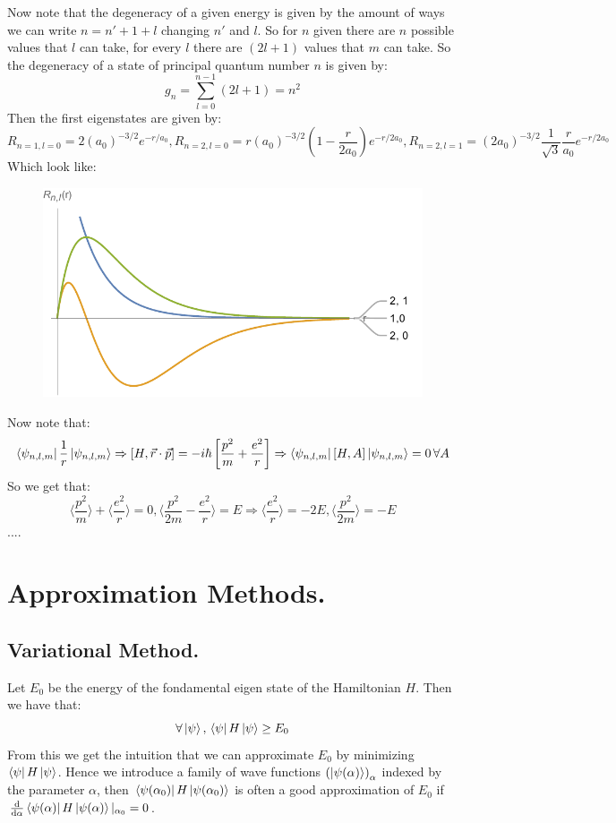 \documentclass[10pt,a4paper]{book}
\begin{document}
Now note that the degeneracy of a given energy is given by the amount of ways we can write $n = n' + 1 + l$ changing $n'$ and $l$. So for $n$ given there are $n$ possible values that $l$ can take, for every $l$ there are $(2l +1)$ values that $m$ can take. So the degeneracy of a state of principal quantum number $n$ is given by:
\[
g_n = \sum_{l = 0}^{n-1} (2l + 1) = n^2
\]
Then the first eigenstates are given by:
\[
R_{n = 1, l =0} = 2(a_0)^{-3/2} e^{-r/a_0}, R_{n = 2, l = 0} = r (a_0)^{-3/2} (1 - \frac{r}{2 a_0})e^{-r/2a_0}, R_{n = 2, l = 1} = (2 a_0)^{-3/2} \frac{1}{\sqrt{3}} \frac{r}{a_0}e^{-r/2a_0}
\]
Which look like:
\begin{figure}[h!]
\centering
\includegraphics[width = 0.6 \textwidth]{graphs/hydrogen_atom_R_Plots}
\end{figure}

Now note that:
\[
\bra{\psi_{n,l,m}} \frac{1}{r} \ket{\psi_{n,l,m}} \Rightarrow [H, \vec{r} \cdot \vec{p}] = - i\hbar \left[\frac{p^2}{m} + \frac{e^2}{r}\right] \Rightarrow \bra{\psi_{n, l, m}} [H, A] \ket{\psi_{n,l,m}} = 0\, \forall A 
\]
So we get that:
\[
\langle \frac{p^2}{m} \rangle + \langle \frac{e^2}{r} \rangle = 0, \langle \frac{p^2}{2m} - \frac{e^2}{r} \rangle = E \Rightarrow \langle \frac{e^2}{r} \rangle = -2 E, \langle \frac{p^2}{2m} \rangle = - E
\]
....

\chapter{Approximation Methods.}
\section{Variational Method.}
Let $E_0$ be the energy of the fondamental eigen state of the Hamiltonian $H$. Then we have that:
\[
\forall \ket\psi, \, \bra \psi H \ket \psi \geq E_0
\]
From this we get the intuition that we can approximate $E_0$ by minimizing $\bra \psi H \ket \psi$. Hence we introduce a family of wave functions $\left(\ket{\psi(\alpha)}\right)_\alpha$ indexed by the parameter $\alpha$, then $\bra{\psi(\alpha_0)} H \ket{\psi(\alpha_0)}$ is often a good approximation of $E_0$ if $\dv{}{\alpha} \bra{\psi(\alpha)} H \ket{\psi(\alpha)} |_{\alpha_0} = 0$.
\end{document}
